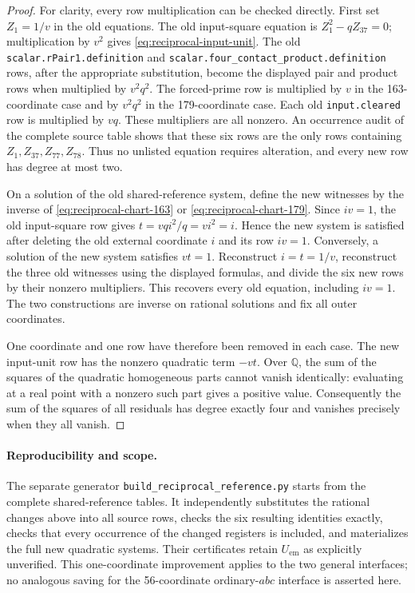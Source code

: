 \documentclass[11pt]{article}
\begin{document}
\begin{proof}
For clarity, every row multiplication can be checked directly.  First set
\(Z_1=1/v\) in the old equations.  The old input-square equation is
\(Z_1^2-qZ_{37}=0\); multiplication by \(v^2\) gives
\eqref{eq:reciprocal-input-unit}.  The old
\nolinkurl{scalar.rPair1.definition} and
\nolinkurl{scalar.four_contact_product.definition} rows, after the
appropriate substitution, become the displayed pair and product rows
when multiplied by \(v^2q^2\).  The forced-prime row is multiplied by
\(v\) in the 163-coordinate case and by \(v^2q^2\) in the
179-coordinate case.  Each old \texttt{input.cleared} row is multiplied
by \(vq\).  These multipliers are all nonzero.  An occurrence audit of
the complete source table shows that these six rows are the only rows
containing \(Z_1,Z_{37},Z_{77},Z_{78}\).  Thus no unlisted equation
requires alteration, and every new row has degree at most two.

On a solution of the old shared-reference system, define the new witnesses
by the inverse of \eqref{eq:reciprocal-chart-163} or
\eqref{eq:reciprocal-chart-179}.  Since \(iv=1\), the old input-square
row gives \(t=vqi^2/q=vi^2=i\).  Hence the new system is satisfied after
deleting the old external coordinate \(i\) and its row \(iv=1\).
Conversely, a solution of the new system satisfies \(vt=1\).  Reconstruct
\(i=t=1/v\), reconstruct the three old witnesses using the displayed
formulas, and divide the six new rows by their nonzero multipliers.  This
recovers every old equation, including \(iv=1\).  The two constructions
are inverse on rational solutions and fix all outer coordinates.

One coordinate and one row have therefore been removed in each case.
The new input-unit row has the nonzero quadratic term \(-vt\).
Over \(\mathbb Q\), the sum of the squares of the quadratic homogeneous
parts cannot vanish identically: evaluating at a real point with a
nonzero such part gives a positive value.  Consequently the sum of the
squares of all residuals has degree exactly four and vanishes precisely
when they all vanish.
\end{proof}

\paragraph{Reproducibility and scope.}
The separate generator \texttt{build\_reciprocal\_reference.py} starts from
the complete shared-reference tables.  It independently substitutes the
rational changes above into all source rows, checks the six resulting
identities exactly, checks that every occurrence of the changed registers
is included, and materializes the full new quadratic systems.  Their
certificates retain \(U_{\mathrm{em}}\) as explicitly unverified.
This one-coordinate improvement applies to the two general interfaces;
no analogous saving for the 56-coordinate ordinary-\(abc\) interface is
asserted here.
\end{document}
